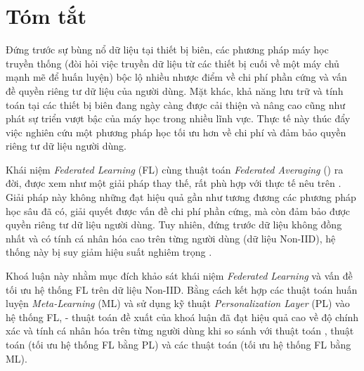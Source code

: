 \chapter*{Tóm tắt}
\label{abstract}

Đứng trước sự bùng nổ dữ liệu tại thiết bị biên, các phương pháp máy học truyền thống (đòi hỏi việc truyền dữ liệu từ các thiết bị cuối về một máy chủ mạnh mẽ để huấn luyện) bộc lộ nhiều nhược điểm về chi phí phần cứng và vấn đề quyền riêng tư dữ liệu của người dùng. Mặt khác, khả năng lưu trữ và tính toán tại các thiết bị biên đang ngày càng được cải thiện và nâng cao cũng như phát sự triển vượt bậc của máy học trong nhiều lĩnh vực. Thực tế này thúc đẩy việc nghiên cứu một phương pháp học tối ưu hơn về chi phí và đảm bảo quyền riêng tư dữ liệu người dùng.

Khái niệm \textit{Federated Learning} (FL) cùng thuật toán \textit{Federated Averaging} () ra đời, được xem như một giải pháp thay thế, rất phù hợp với thực tế nêu trên \cite{mcmahan2017communication}. Giải pháp này không những đạt hiệu quả gần như tương đương các phương pháp học sâu đã có, giải quyết được vấn đề chi phí phần cứng, mà còn đảm bảo được quyền riêng tư dữ liệu người dùng. Tuy nhiên, đứng trước dữ liệu không đồng nhất và có tính cá nhân hóa cao trên từng người dùng (dữ liệu Non-IID), hệ thống này bị suy giảm hiệu suất nghiêm trọng \cite{zhao2018federated}.

Khoá luận này nhằm mục đích khảo sát khái niệm \textit{Federated Learning} và vấn đề tối ưu hệ thống FL trên dữ liệu Non-IID. Bằng cách kết hợp các thuật toán huấn luyện \textit{Meta-Learning} \cite{hospedales2020meta} (ML) và sử dụng kỹ thuật \textit{Personalization Layer} \cite{zhu2021federated} (PL) vào hệ thống FL,  - thuật toán đề xuất của khoá luận đã đạt hiệu quả cao về độ chính xác và tính cá nhân hóa trên từng người dùng khi so sánh với thuật toán , thuật toán  \cite{arivazhagan2019federated} (tối ưu hệ thống FL bằng PL) và các thuật toán  \cite{chen2018federated} (tối ưu hệ thống FL bằng ML).
